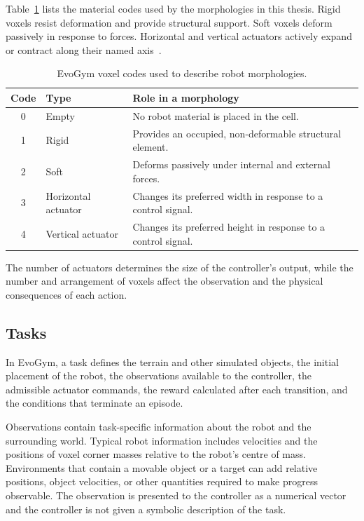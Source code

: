 Table~\ref{tab:voxel-types} lists the material codes used by the morphologies in this thesis. Rigid voxels resist deformation and provide structural support. Soft voxels deform passively in response to forces. Horizontal and vertical actuators actively expand or contract along their named axis~\cite{bhatia2021evolution}.

\begin{table}[htbp]
  \centering
  \caption{EvoGym voxel codes used to describe robot morphologies.}
  \label{tab:voxel-types}
  \begin{tabularx}{0.9\textwidth}{@{}clX@{}}
    \toprule
    Code & Type & Role in a morphology \\
    \midrule
    0 & Empty & No robot material is placed in the cell. \\
    1 & Rigid & Provides an occupied, non-deformable structural element. \\
    2 & Soft & Deforms passively under internal and external forces. \\
    3 & Horizontal actuator & Changes its preferred width in response to a control signal. \\
    4 & Vertical actuator & Changes its preferred height in response to a control signal. \\
    \bottomrule
  \end{tabularx}
\end{table}

The number of actuators determines the size of the controller's output, while the number and arrangement of voxels affect the observation and the physical consequences of each action.

\subsection{Tasks}

In EvoGym, a task defines the terrain and other simulated objects, the initial placement of the robot, the observations available to the controller, the admissible actuator commands, the reward calculated after each transition, and the conditions that terminate an episode.

Observations contain task-specific information about the robot and the surrounding world. Typical robot information includes velocities and the positions of voxel corner masses relative to the robot's centre of mass. Environments that contain a movable object or a target can add relative positions, object velocities, or other quantities required to make progress observable. The observation is presented to the controller as a numerical vector and the controller is not given a symbolic description of the task.

